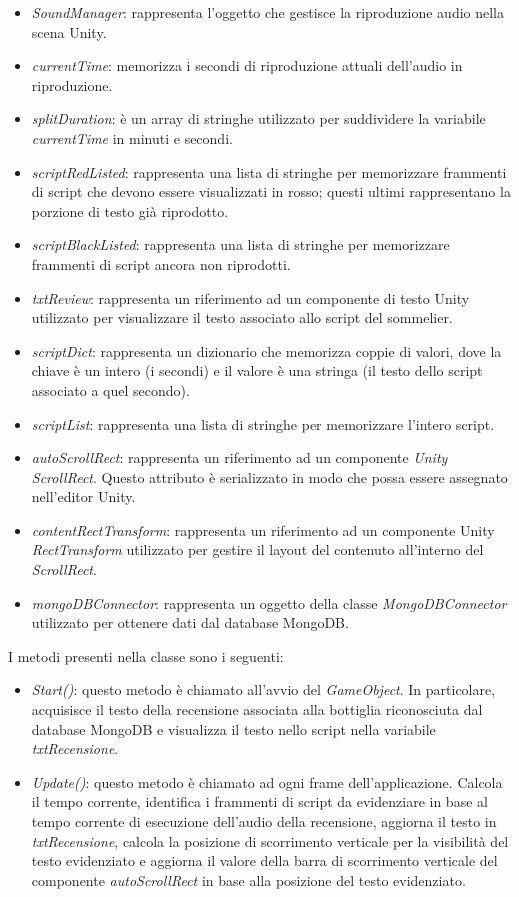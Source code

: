 \begin{itemize}
    \item \textit{SoundManager}: rappresenta l'oggetto che gestisce la riproduzione audio nella scena Unity.
    \item \textit{currentTime}: memorizza i secondi di riproduzione attuali dell'audio in riproduzione. 
    \item \textit{splitDuration}: è un array di stringhe utilizzato per suddividere la variabile \textit{currentTime} in minuti e secondi.
    \item \textit{scriptRedListed}: rappresenta una lista di stringhe per memorizzare frammenti di script che devono essere visualizzati in rosso; questi ultimi rappresentano la porzione di testo già riprodotto.
    \item \textit{scriptBlackListed}: rappresenta una lista di stringhe per memorizzare frammenti di script ancora non riprodotti.
    \item \textit{txtReview}: rappresenta un riferimento ad un componente di testo Unity utilizzato per visualizzare il testo associato allo script del sommelier.
    \item \textit{scriptDict}: rappresenta un dizionario che memorizza coppie di valori, dove la chiave è un intero (i secondi) e il valore è una stringa (il testo dello script associato a quel secondo).
    \item \textit{scriptList}: rappresenta una lista di stringhe per memorizzare l'intero script.
    \item \textit{autoScrollRect}: rappresenta un riferimento ad un componente \textit{Unity ScrollRect}. Questo attributo è serializzato in modo che possa essere assegnato nell'editor Unity. 
    \item \textit{contentRectTransform}: rappresenta un riferimento ad un componente Unity \textit{RectTransform} utilizzato per gestire il layout del contenuto all'interno del \textit{ScrollRect}.
    \item \textit{mongoDBConnector}: rappresenta un oggetto della classe \textit{MongoDBConnector} utilizzato per ottenere dati dal database MongoDB.
\end{itemize}

I metodi presenti nella classe sono i seguenti:

\begin{itemize}
    \item \textit{Start()}: questo metodo è chiamato all'avvio del \textit{GameObject}. In particolare, acquisisce il testo della recensione associata alla bottiglia riconosciuta dal database MongoDB e visualizza il testo nello script nella variabile \textit{txtRecensione}.
    \item \textit{Update()}: questo metodo è chiamato ad ogni frame dell'applicazione. Calcola il tempo corrente, identifica i frammenti di script da evidenziare in base al tempo corrente di esecuzione dell'audio della recensione, aggiorna il testo in \textit{txtRecensione}, calcola la posizione di scorrimento verticale per la visibilità del testo evidenziato e aggiorna il valore della barra di scorrimento verticale del componente \textit{autoScrollRect} in base alla posizione del testo evidenziato.
\end{itemize}

